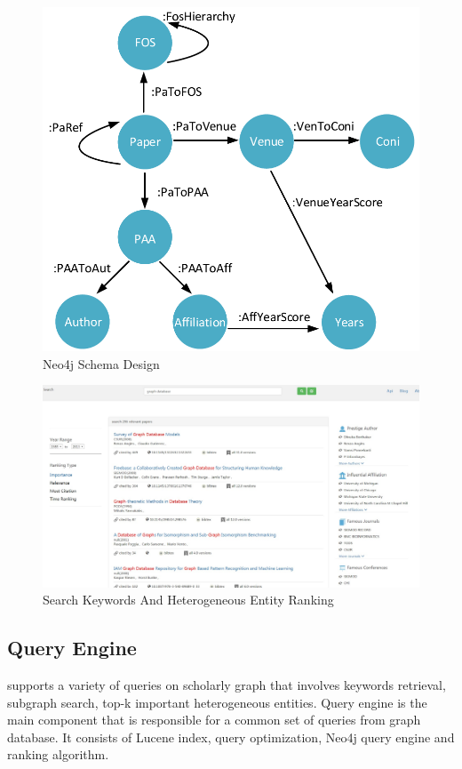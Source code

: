 


\begin{figure}
\centering
\includegraphics[width=0.5\columnwidth]{neo4jSchema.pdf}
\caption{Neo4j Schema Design}
\label{fig:schema}
\vspace{-3ex}
\end{figure}

\begin{figure}[tp]
\centering
\includegraphics[width=\textwidth]{searchKeywords110.pdf}
\caption{Search Keywords And Heterogeneous Entity Ranking}
\label{fig: search keywords}
\vspace{-3ex}
\end{figure}
\subsection{Query Engine}
\oursystem supports a variety of queries on scholarly graph that involves keywords retrieval, subgraph search, top-k important heterogeneous entities. Query engine is the main component that is responsible for a common set of queries from graph database. It consists of Lucene index, query optimization, Neo4j query engine and ranking algorithm.

